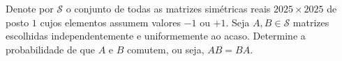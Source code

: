 Denote por \(\mathcal{S}\) o conjunto de todas as matrizes simétricas reais \(2025 \times 2025\) de posto \(1\) cujos elementos assumem valores \(-1\) ou \(+1\). Seja \(A, B \in \mathcal{S}\) matrizes escolhidas independentemente e uniformemente ao acaso. Determine a probabilidade de que \(A\) e \(B\) comutem, ou seja, \(AB = BA\).
